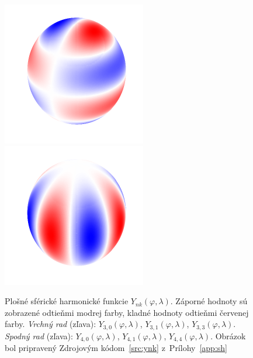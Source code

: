 \documentclass[a4paper, 12pt]{book}
\begin{document}
\begin{figure}[bt]
\includegraphics{./fig-spherical-harmonic-n4-k1.pdf}
\includegraphics{./fig-spherical-harmonic-n4-k4.pdf}
\caption{Plošné sférické harmonické funkcie $Y_{nk}(\varphi, \lambda)$.  
Záporné hodnoty sú zobrazené odtieňmi modrej farby, kladné hodnoty odtieňmi 
červenej farby.  \textit{Vrchný rad} (zľava): $Y_{3,0}(\varphi, \lambda)$, 
$Y_{3,1}(\varphi, \lambda)$, $Y_{3,3}(\varphi, \lambda)$.  \textit{Spodný rad} 
(zľava): $Y_{4,0}(\varphi, \lambda)$, $Y_{4,1}(\varphi, \lambda)$, 
$Y_{4,4}(\varphi, \lambda)$.  Obrázok bol pripravený Zdrojovým 
kódom~\ref{src:ynk} z~Prílohy~\ref{app:sh}}
\label{fig:sh}
\end{figure}
\end{document}
